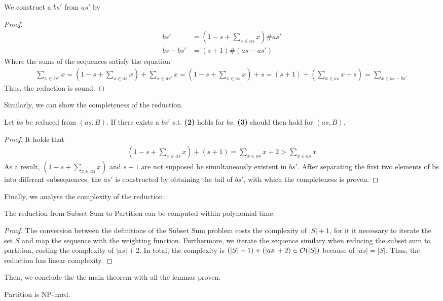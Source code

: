 We construct a $bs'$ from $as'$ by 
\begin{proof}
    \begin{align*}
        bs' &= (1 - s + \sum_{x \in as} x) \# as' \\
        bs - bs' &=  (s + 1) \# (as - as')
    \end{align*}
    Where the sums of the sequences satisfy the equation 
    \begin{align*}
        \sum_{x \in bs'} x = (1 - s + \sum_{x \in as} x) + \sum_{x \in as'} x
        = (1 - s + \sum_{x \in as} x) + s = (s + 1) + (\sum_{x \in as} x - s)
        = \sum_{x \in bs - bs'}
    \end{align*}
    Thus, the reduction is sound.
\end{proof}
Similarly, we can show the completeness of the reduction.
\begin{lemma}[Completeness]
    Let $bs$ be reduced from $(as, B)$. If there exists a $bs'$ s.t. \textbf{(2)} holds for $bs$, 
    \textbf{(3)} should then hold for $(as, B)$.
\end{lemma}
\begin{proof}
    It holds that
\begin{align*}
    (1 - s + \sum_{x \in as} x) + (s + 1) = \sum_{x \in as} x + 2 > \sum_{x \in as} x
\end{align*}
As a result, $(1 - s + \sum_{x \in as} x)$ and $s + 1$ are not supposed be simultaneously existent in $bs'$. 
After separating the first two elements of bs into different subsequences, the $as'$ is constructed 
by obtaining the tail of $bs'$, with which the completeness is proven.
\end{proof} 
Finally, we analyse the complexity of the reduction.
\begin{lemma}
    The reduction from Subset Sum to Partition can be computed within polynomial time.
\end{lemma}
\begin{proof}
The conversion between the definitions of the Subset Sum problem costs the complexity of $|S| + 1$,
for it it necessary to iterate the set $S$ and map the sequence with the weighting function. Furthermore, we iterate the sequence similary when reducing the subset sum to partition, costing
the complexity of $|as| + 2$. In total, the complexity is $(|S| + 1) + (|as| + 2) \in \mathcal{O}({|S|})$  because of $|as| = |S|$.
Thus, the reduction has linear complexity.
\end{proof}
Then, we conclude the the main theorem with all the lemmas proven.
\begin{theorem}
    Partition is NP-hard.
\end{theorem}
